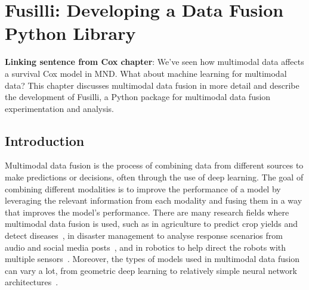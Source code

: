 \chapter{Fusilli: Developing a Data Fusion Python Library}
\label{fusilli_development}

\textbf{Linking sentence from Cox chapter}: 
We've seen how multimodal data affects a survival Cox model in MND.
What about machine learning for multimodal data?
This chapter discusses multimodal data fusion in more detail and describe the development of Fusilli, a Python package for multimodal data fusion experimentation and analysis.

\section{Introduction}

Multimodal data fusion is the process of combining data from different sources to make predictions or decisions, often through the use of deep learning.
The goal of combining different modalities is to improve the performance of a model by leveraging the relevant information from each modality and fusing them in a way that improves the model's performance.
There are many research fields where multimodal data fusion is used, such as in agriculture to predict crop yields and detect diseases~\cite{s.s.gopiMultimodalMachineLearning2023, patilRiceFusionMultimodalityData2022}, in disaster management to analyse response scenarios from audio and social media posts~\cite{algiriyageMultisourceMultimodalData2021}, and in robotics to help direct the robots with multiple sensors~\cite{duanMultimodalSensorsMLBased2022}.
Moreover, the types of models used in multimodal data fusion can vary a lot, from geometric deep learning to relatively simple neural network architectures~\cite{cuiDeepMultimodalFusion2022}.


